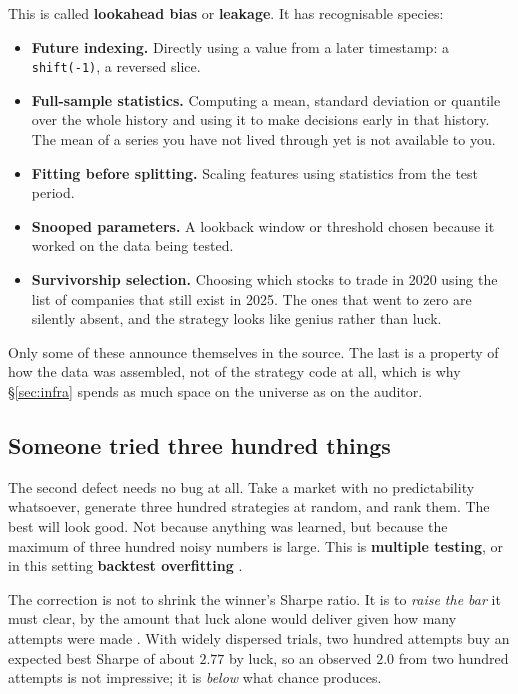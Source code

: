 \documentclass[11pt,a4paper]{article}
\begin{document}
This is called \textbf{lookahead bias} or \textbf{leakage}. It has recognisable species:

\begin{itemize}
\item \textbf{Future indexing.} Directly using a value from a later timestamp: a
  \texttt{shift(-1)}, a reversed slice.
\item \textbf{Full-sample statistics.} Computing a mean, standard deviation or quantile over the
  whole history and using it to make decisions early in that history. The mean of a series you
  have not lived through yet is not available to you.
\item \textbf{Fitting before splitting.} Scaling features using statistics from the test period.
\item \textbf{Snooped parameters.} A lookback window or threshold chosen because it worked on the
  data being tested.
\item \textbf{Survivorship selection.} Choosing which stocks to trade in 2020 using the list of
  companies that still exist in 2025. The ones that went to zero are silently absent, and the
  strategy looks like genius rather than luck.
\end{itemize}

Only some of these announce themselves in the source. The last is a property of how the data was
assembled, not of the strategy code at all, which is why \S\ref{sec:infra} spends as much space
on the universe as on the auditor.

\subsection{Someone tried three hundred things}

The second defect needs no bug at all. Take a market with no predictability whatsoever, generate
three hundred strategies at random, and rank them. The best will look good. Not because anything
was learned, but because the maximum of three hundred noisy numbers is large. This is
\textbf{multiple testing}, or in this setting \textbf{backtest overfitting}
\citep{bailey2017,harvey2016}.

The correction is not to shrink the winner's Sharpe ratio. It is to \emph{raise the bar} it must
clear, by the amount that luck alone would deliver given how many attempts were made
\citep{bailey2014}. With widely dispersed trials, two hundred attempts buy an expected best Sharpe
of about $2.77$ by luck, so an observed $2.0$ from two hundred attempts is not impressive; it
is \emph{below} what chance produces.
\end{document}
